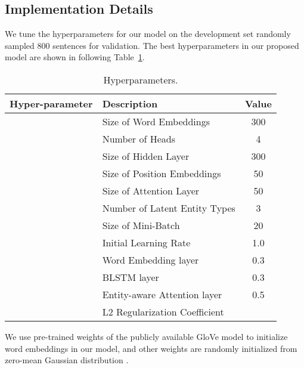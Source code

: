 \documentclass[twoside,leqno,twocolumn]{article}
\begin{document}
\subsection{Implementation Details}
We tune the hyperparameters for our model on the development set randomly sampled 800 sentences for validation.
The best hyperparameters in our proposed model are shown in following Table~\ref{tb:1}.
\begin{table}[!ht]
\begin{center}
\renewcommand{\arraystretch}{1.1}
\begin{tabular}{>{\centering\arraybackslash}m{1.8cm} l c}
Hyper-parameter & Description & Value \\ 
\hline\hline
 & Size of Word Embeddings & 300 \\ \hline
 & Number of Heads & 4 \\ \hline
 & Size of Hidden Layer & 300 \\ \hline
 & Size of Position Embeddings & 50 \\ \hline
 & Size of Attention Layer & 50 \\ \hline
 & Number of Latent Entity Types & 3 \\ \hline
 & Size of Mini-Batch & 20 \\ \hline
 & Initial Learning Rate & 1.0 \\ \hline
\multirow{3}{1.8cm}{\textit{dropout rate}\centering}
& Word Embedding layer & 0.3 \\
& BLSTM layer& 0.3 \\
& Entity-aware Attention layer & 0.5 \\ \hline
 & L2 Regularization Coefficient &  \\ \hline
\end{tabular}
\end{center}
\caption{Hyperparameters.}
\label{tb:1}
\end{table}

We use pre-trained weights of the publicly available GloVe model \cite{pennington2014glove} to initialize word embeddings in our model, and other weights are randomly initialized from zero-mean Gaussian distribution \cite{glorot2010understanding}.
\end{document}
